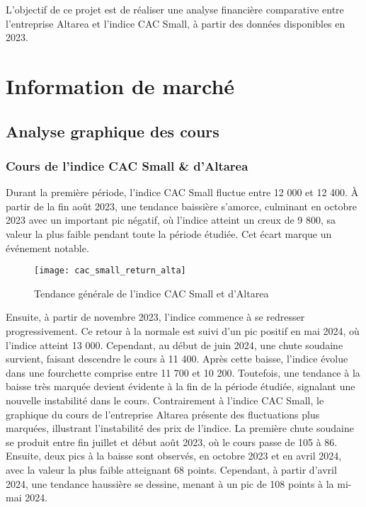 \documentclass[a4paper, 12pt]{report}
\begin{document}
L'objectif de ce projet est de réaliser une analyse financière comparative entre l'entreprise Altarea et l'indice CAC Small, à partir des données disponibles en 2023.
\thispagestyle{empty}
\newpage
\mbox{}
\thispagestyle{empty} %
\chapter{Information de marché}

\section{Analyse graphique des cours}

\subsection{Cours de l'indice CAC Small \& d'Altarea}
\noindent
Durant la première période, l'indice CAC Small fluctue entre 12 000 et 12 400. À partir de la fin août 2023, une tendance baissière s'amorce, culminant en octobre 2023 avec un important pic négatif, où l'indice atteint un creux de 9 800, sa valeur la plus faible pendant toute la période étudiée. Cet écart marque un événement notable.
\begin{wrapfigure}{r}{0.75\textwidth}
	\centering
	\texttt{[image: cac\_small\_return\_alta]}
	\caption{Tendance générale de l'indice CAC Small et d'Altarea}
\end{wrapfigure}
Ensuite, à partir de novembre 2023, l'indice commence à se redresser progressivement. Ce retour à la normale est suivi d'un pic positif en mai 2024, où l'indice atteint 13 000. Cependant, au début de juin 2024, une chute soudaine survient, faisant descendre le cours à 11 400. Après cette baisse, l'indice évolue dans une fourchette comprise entre 11 700 et 10 200. Toutefois, une tendance à la baisse très marquée devient évidente à la fin de la période étudiée, signalant une nouvelle instabilité dans le cours.
\noindent
Contrairement à l'indice CAC Small, le graphique du cours de l'entreprise Altarea présente des fluctuations plus marquées, illustrant l'instabilité des prix de l'indice. 
\noindent
La première chute soudaine se produit entre fin juillet et début août 2023, où le cours passe de 105 à 86.
\noindent
Ensuite, deux pics à la baisse sont observés, en octobre 2023 et en avril 2024, avec la valeur la plus faible atteignant 68 points. Cependant, à partir d'avril 2024, une tendance haussière se dessine, menant à un pic de 108 points à la mi-mai 2024.
\end{document}
